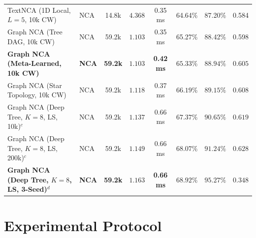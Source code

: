 \documentclass[10pt,twocolumn,letterpaper]{article}
\begin{document}
\begin{table}[tbp]
\begin{tabular*}{\textwidth}{@{\extracolsep{\fill}}llcccccc@{}}
\midrule
TextNCA (1D Local, $L=5$, 10k CW) & NCA & 14.8k & $4.368$ & 0.35 ms & 64.64\% & 87.20\% & 0.584 \\
Graph NCA (Tree DAG, 10k CW) & NCA & 59.2k & $1.103$ & 0.35 ms & 65.27\% & 88.42\% & 0.598 \\
\textbf{Graph NCA (Meta-Learned, 10k CW)} & \textbf{NCA} & \textbf{59.2k} & $\mathbf{1.103}$ & \textbf{0.42 ms} & $\mathbf{65.33\%}$ & $\mathbf{88.94\%}$ & $\mathbf{0.605}$ \\
Graph NCA (Star Topology, 10k CW) & NCA & 59.2k & $1.118$ & 0.37 ms & $\mathbf{66.19\%}$ & $\mathbf{89.15\%}$ & $\mathbf{0.608}$ \\
\midrule
Graph NCA (Deep Tree, $K{=}8$, LS, 10k)$^c$ & NCA & 59.2k & $1.137$ & 0.66 ms & $67.37\%$ & $90.65\%$ & $0.619$ \\
Graph NCA (Deep Tree, $K{=}8$, LS, 200k)$^c$ & NCA & 59.2k & $1.149$ & 0.66 ms & $68.07\%$ & $91.24\%$ & $\mathbf{0.628}$ \\
\textbf{Graph NCA (Deep Tree, $K{=}8$, LS, 3-Seed)}$^d$ & \textbf{NCA} & \textbf{59.2k} & $\mathbf{1.163}$ & \textbf{0.66 ms} & $\mathbf{68.92\%}$ & $\mathbf{95.27\%}$ & $0.348$ \\
\bottomrule
\end{tabular*}
\end{table}

\section{Experimental Protocol}
\end{document}
